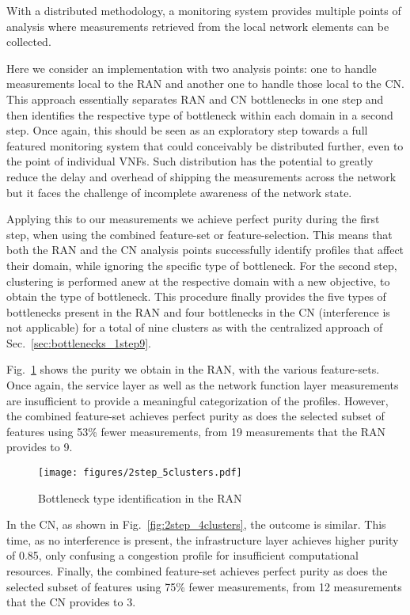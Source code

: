 \documentclass[journal,comsoc]{IEEEtran}
\begin{document}
%
With a distributed methodology, a monitoring system provides multiple points of analysis where measurements retrieved from the local network elements can be collected.

%
Here we consider an implementation with two analysis points: one to handle measurements local to the RAN and another one to handle those local to the CN.
This approach essentially separates RAN and CN bottlenecks in one step and then identifies the respective type of bottleneck within each domain in a second step.
Once again, this should be seen as an exploratory step towards a full featured monitoring system that could conceivably be distributed further, even to the point of individual VNFs.
Such distribution has the potential to greatly reduce the delay and overhead of shipping the measurements across the network but it faces the challenge of incomplete awareness of the network state.

% 
Applying this to our measurements we achieve perfect purity during the first step, when using the combined feature-set or feature-selection.
This means that both the RAN and the CN analysis points successfully identify profiles that affect their domain, while ignoring the specific type of bottleneck.
For the second step, clustering is performed anew at the respective domain with a new objective, to obtain the type of bottleneck.
This procedure finally provides the five types of bottlenecks present in the RAN and four bottlenecks in the CN (interference is not applicable) for a total of nine clusters as with the centralized approach of Sec.~\ref{sec:bottlenecks_1step9}.

%
Fig.~\ref{fig:2step_5clusters} shows the purity we obtain in the RAN, with the various feature-sets.
Once again, the service layer as well as the network function layer measurements are insufficient to provide a meaningful categorization of the profiles. However, the combined feature-set achieves perfect purity as does the selected subset of features using 53\% fewer measurements, from 19 measurements that the RAN provides to 9.

%
\begin{figure}[t]
	\centering
	\texttt{[image: figures/2step\_5clusters.pdf]}
	\vspace{-8mm}
	\caption{Bottleneck type identification in the RAN}
	\vspace{-4mm}
	\label{fig:2step_5clusters}
\end{figure}

%
In the CN, as shown in Fig.~\ref{fig:2step_4clusters}, the outcome is similar. This time, as no interference is present, the infrastructure layer achieves higher purity of 0.85, only confusing a congestion profile for insufficient computational resources.
Finally, the combined feature-set achieves perfect purity as does the selected subset of features using 75\% fewer measurements, from 12 measurements that the CN provides to 3.
\end{document}
